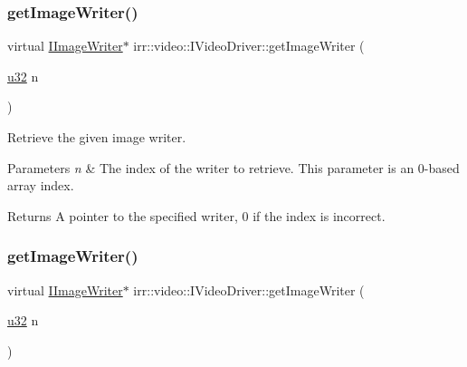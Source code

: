 \subsubsection{\texorpdfstring{get\+Image\+Writer()}{getImageWriter()}\hspace{0.1cm}{\footnotesize\ttfamily [1/2]}}
{\footnotesize\ttfamily virtual \hyperlink{classirr_1_1video_1_1IImageWriter}{I\+Image\+Writer}$\ast$ irr\+::video\+::\+I\+Video\+Driver\+::get\+Image\+Writer (\begin{DoxyParamCaption}\item[{\hyperlink{namespaceirr_a0416a53257075833e7002efd0a18e804}{u32}}]{n }\end{DoxyParamCaption})\hspace{0.3cm}{\ttfamily [pure virtual]}}



Retrieve the given image writer. 


\begin{DoxyParams}{Parameters}
{\em n} & The index of the writer to retrieve. This parameter is an 0-\/based array index. \\
\hline
\end{DoxyParams}
\begin{DoxyReturn}{Returns}
A pointer to the specified writer, 0 if the index is incorrect. 
\end{DoxyReturn}
\mbox{\label{classirr_1_1video_1_1IVideoDriver_acdc5e788993c117efebb22e155ab6a77}} 
\subsubsection{\texorpdfstring{get\+Image\+Writer()}{getImageWriter()}\hspace{0.1cm}{\footnotesize\ttfamily [2/2]}}
{\footnotesize\ttfamily virtual \hyperlink{classirr_1_1video_1_1IImageWriter}{I\+Image\+Writer}$\ast$ irr\+::video\+::\+I\+Video\+Driver\+::get\+Image\+Writer (\begin{DoxyParamCaption}\item[{\hyperlink{namespaceirr_a0416a53257075833e7002efd0a18e804}{u32}}]{n }\end{DoxyParamCaption})\hspace{0.3cm}{\ttfamily [pure virtual]}}



